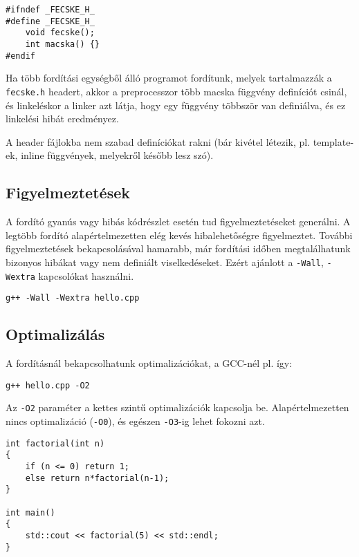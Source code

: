 \documentclass[a4paper,11.5pt,table]{article}
\begin{document}
	\begin{lstlisting}
#ifndef _FECSKE_H_
#define _FECSKE_H_
	void fecske();
	int macska() {}
#endif
	\end{lstlisting}
		
	Ha több fordítási egységből álló programot fordítunk, melyek tartalmazzák a \texttt{fecske.h} headert, akkor a preprocesszor több macska függvény definíciót csinál, és linkeléskor a linker azt látja, hogy egy függvény többször van definiálva, és ez linkelési hibát eredményez.
	\begin{note}
		A header fájlokba nem szabad definíciókat rakni (bár kivétel létezik, pl. template-ek, inline függvények, melyekről később lesz szó).
	\end{note}
	
	\subsection{Figyelmeztetések}

  A fordító gyanús vagy hibás kódrészlet esetén tud figyelmeztetéseket generálni. A legtöbb fordító alapértelmezetten elég kevés hibalehetőségre figyelmeztet. További figyelmeztetések bekapcsolásával hamarabb, már fordítási időben megtalálhatunk bizonyos hibákat vagy nem definiált viselkedéseket. Ezért ajánlott a \texttt{-Wall}, \texttt{-Wextra} kapcsolókat használni.

	{\centering \texttt{g++ -Wall -Wextra hello.cpp} \par}

	\subsection{Optimalizálás}
	A fordításnál bekapcsolhatunk optimalizációkat, a GCC-nél pl. így:
	
	{\centering \texttt{g++ hello.cpp -O2} \par}
	
	Az \texttt{-O2} paraméter a kettes szintű optimalizációk kapcsolja be. Alapértelmezetten nincs optimalizáció (\texttt{-O0}), és egészen \texttt{-O3}-ig lehet fokozni azt.
	\bigskip
	
	\begin{lstlisting}
int factorial(int n)
{
	if (n <= 0) return 1;
	else return n*factorial(n-1);
}

int main()
{
	std::cout << factorial(5) << std::endl;
}
	\end{lstlisting}
	
\end{document}

